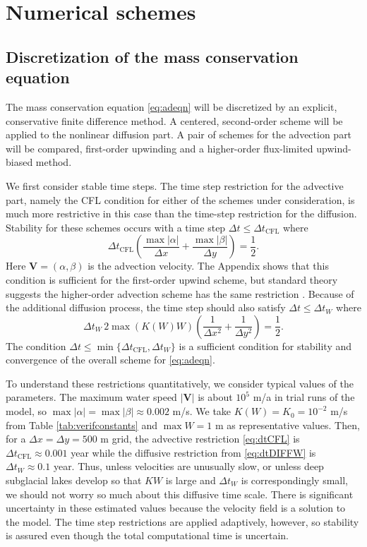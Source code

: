 \documentclass[11pt,final]{amsart}%
\newcommand\bV{\mathbf{V}}
\begin{document}
\section{Numerical schemes}  \label{sec:num}

\subsection*{Discretization of the mass conservation equation}  The mass conservation equation \eqref{eq:adeqn} will be discretized by an explicit, conservative finite difference method.   A centered, second-order scheme will be applied to the nonlinear diffusion part.  A pair of schemes for the advection part will be compared, first-order upwinding and a higher-order flux-limited upwind-biased method.

We first consider stable time steps.  The time step restriction for the advective part, namely the CFL condition for either of the schemes under consideration, is much more restrictive in this case than the time-step restriction for the diffusion.  Stability for these schemes occurs with a time step $\Delta t \le \Delta t_{\text{CFL}}$ where
\begin{equation}
\Delta t_{\text{CFL}} \left(\frac{\max |\alpha|}{\Delta x} + \frac{\max |\beta|}{\Delta y}\right) = \frac{1}{2}. \label{eq:dtCFL}
\end{equation}
Here $\bV=(\alpha,\beta)$ is the advection velocity.  The Appendix shows that this condition is sufficient for the first-order upwind scheme, but standard theory suggests the higher-order advection scheme has the same restriction \citep{HundsdorferVerwer2010}.  Because of the additional diffusion process, the time step should also satisfy $\Delta t \le \Delta t_{W}$ \citep{MortonMayers} where
\begin{equation}
\Delta t_W\, 2 \max(K(W) W) \left(\frac{1}{\Delta x^2} + \frac{1}{\Delta y^2}\right) = \frac{1}{2}. \label{eq:dtDIFFW}
\end{equation}
The condition $\Delta t \le \min\{\Delta t_{\text{CFL}}, \Delta t_W\}$ is a sufficient condition for stability and convergence of the overall scheme for \eqref{eq:adeqn}.

To understand these restrictions quantitatively, we consider typical values of the parameters.  The maximum water speed $|\bV|$ is about $10^5$ m/a in trial runs of the model, so $\max |\alpha| = \max |\beta| \approx 0.002$ m/s.  We take $K(W)=K_0=10^{-2}$ m/s from Table \ref{tab:verifconstants} and $\max W=1$ m as representative values.  Then, for a $\Delta x = \Delta y = 500$ m grid, the advective restriction \eqref{eq:dtCFL} is $\Delta t_{\text{CFL}} \approx 0.001$ year while the diffusive restriction from \eqref{eq:dtDIFFW} is $\Delta t_W \approx 0.1$ year.  Thus, unless velocities are unusually slow, or unless deep subglacial lakes develop so that $KW$ is large and $\Delta t_W$ is correspondingly small, we should not worry so much about this diffusive time scale.  There is significant uncertainty in these estimated values because the velocity field is a solution to the model.  The time step restrictions are applied adaptively, however, so stability is assured even though the total computational time is uncertain.
\end{document}

